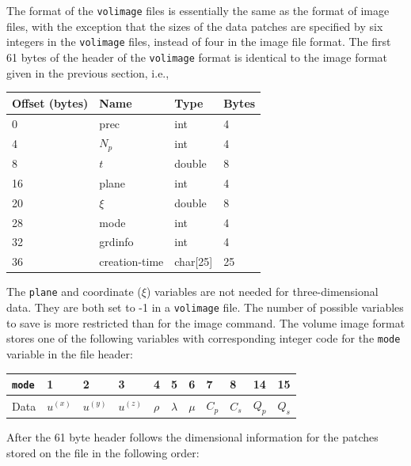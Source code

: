 \documentclass[11pt]{report}
\begin{document}
{The format of the \verb+volimage+ files is essentially the same as the format of image files, with the
exception that the sizes of the data patches are specified by six integers in the \verb+volimage+ files,
instead of four in the image file format.  The first 61 bytes of the header of the \verb+volimage+ format is
identical to the image format given in the previous section, i.e.,
\begin{center}
	\begin{tabular}{llll}\hline
		Offset (bytes) & Name          & Type     & Bytes \\ \hline
		0              & prec          & int      & 4     \\ \hline
		4              & $N_p$         & int      & 4     \\ \hline
		8              & $t$           & double   & 8     \\ \hline
		16             & plane         & int      & 4     \\ \hline
		20             & $\xi$         & double   & 8     \\ \hline
		28             & mode          & int      & 4     \\ \hline
		32             & grdinfo       & int      & 4     \\ \hline
		36             & creation-time & char[25] & 25    \\ \hline
	\end{tabular}
\end{center}
The \verb+plane+ and coordinate ($\xi$) variables are not needed for three-dimensional data. They are both
set to -1 in a \verb+volimage+ file.  The number of possible variables to save is more restricted
than for the image command. The volume image format stores one of the following variables with
corresponding integer code for the \verb+mode+ variable in the file header:
\begin{center}
	\begin{tabular}{l||l|l|l|l|l|l|l|l|l|l}\hline
		{\tt mode} & 1         & 2         & 3         & 4      & 5         & 6     & 7     & 8     & 14    & 15    \\ \hline
		Data       & $u^{(x)}$ & $u^{(y)}$ & $u^{(z)}$ & $\rho$ & $\lambda$ & $\mu$ & $C_p$ & $C_s$ & $Q_p$ & $Q_s$ \\ \hline
	\end{tabular}
\end{center}
After the 61 byte header follows the dimensional information for the patches stored on
the file in the following order:
}
\end{document}
